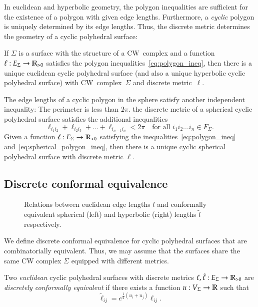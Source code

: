 \documentclass[Thesis.tex]{subfiles}
\begin{document}
  In euclidean and hyperbolic geometry, the polygon inequalities are
  sufficient for the existence of a polygon with given edge
  lengths. Furthermore, a \emph{cyclic} polygon is uniquely determined
  by its edge lengths. Thus, the discrete metric determines the geometry
  of a cyclic polyhedral surface:

  If $\Sigma$ is a surface with the structure of a CW~complex and a
  function $\ell:E_{\Sigma}\rightarrow\mathbb R_{>0}$ satisfies the polygon
  inequalities~\eqref{eq:polygon_ineq}, then there is a unique euclidean
  cyclic polyhedral surface (and also a unique hyperbolic cyclic
  polyhedral surface) with CW~complex~$\Sigma$ and discrete
  metric~$\ell$.

  The edge lengths of a cyclic polygon in the sphere satisfy another
  independent inequality: The perimeter is less than $2\pi$.  the discrete metric of a
  spherical cyclic polyhedral surface satisfies the additional
  inequalities
  \begin{equation}
    \label{eq:spherical_polygon_ineq}
      \ell_{i_{1}i_{2}}+\ell_{i_{2}i_{3}}+\ldots+\ell_{i_{n-1}i_{n}}
      <2\pi
    \quad
    \text{for all $i_{1}i_{2}\ldots i_{n}\in F_{\Sigma}$.}
  \end{equation}
  Given a function $\ell:E_{\Sigma}\rightarrow\mathbb R_{>0}$ satisfying the
  inequalities~\eqref{eq:polygon_ineq}
  and~\eqref{eq:spherical_polygon_ineq}, then there is a unique cyclic
  spherical polyhedral surface with discrete metric $\ell$.

  \subsection{Discrete conformal equivalence}
  \label{sec:discr-conf-equiv}

  \begin{figure}
  \centering
  \resizebox{0.6\textwidth}{!}{
  
  
  }
  \caption{Relations between euclidean edge lengths $l$ and conformally equivalent spherical (left) and hyperbolic (right) lengths $\tilde l$ respectively.}
  \label{fig:geometries}
  \end{figure}


  We define discrete conformal equivalence for cyclic polyhedral
  surfaces that are combinatorially equivalent. Thus, we may assume that
  the surfaces share the same CW complex $\Sigma$ equipped with
  different metrics.

  Two \emph{euclidean} cyclic polyhedral surfaces with
  discrete metrics $\ell,\tilde\ell:E_{\Sigma}\rightarrow\mathbb R_{>0}$ are
  \emph{discretely conformally equivalent} if there exists a function
  $u:V_{\Sigma}\rightarrow\mathbb R$ such that
  \begin{equation}
    \label{eq:tilde_ell_euc}
    \tilde\ell_\mathit{ij}=e^{\frac{1}{2}(u_{i}+u_{j})}\ell_\mathit{ij}.
  \end{equation}
\end{document}
